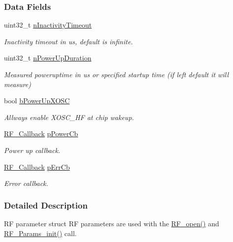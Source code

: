 \subsubsection*{Data Fields}
\begin{DoxyCompactItemize}
\item 
uint32\+\_\+t \hyperlink{struct_r_f___params_a01d3752799ea4318bbf9d1384cb49b97}{n\+Inactivity\+Timeout}
\begin{DoxyCompactList}\small\item\em Inactivity timeout in us, default is infinite. \end{DoxyCompactList}\item 
uint32\+\_\+t \hyperlink{struct_r_f___params_a58dc682aa09acabe6411ea186dd3aebf}{n\+Power\+Up\+Duration}
\begin{DoxyCompactList}\small\item\em Measured poweruptime in us or specified startup time (if left default it will measure) \end{DoxyCompactList}\item 
bool \hyperlink{struct_r_f___params_a66feaf5103de9d0b45085c7c44ea918b}{b\+Power\+Up\+X\+O\+S\+C}
\begin{DoxyCompactList}\small\item\em Allways enable X\+O\+S\+C\+\_\+\+H\+F at chip wakeup. \end{DoxyCompactList}\item 
\hyperlink{_r_f_8h_a4d2ce6dc70b0f329dc5e249ec10c574a}{R\+F\+\_\+\+Callback} \hyperlink{struct_r_f___params_ae683ebc129d40a11fb9ec7e371f1e11b}{p\+Power\+Cb}
\begin{DoxyCompactList}\small\item\em Power up callback. \end{DoxyCompactList}\item 
\hyperlink{_r_f_8h_a4d2ce6dc70b0f329dc5e249ec10c574a}{R\+F\+\_\+\+Callback} \hyperlink{struct_r_f___params_ab7be231b23fab2503b8c54b474fba74d}{p\+Err\+Cb}
\begin{DoxyCompactList}\small\item\em Error callback. \end{DoxyCompactList}\end{DoxyCompactItemize}


\subsubsection{Detailed Description}
R\+F parameter struct R\+F parameters are used with the \hyperlink{_r_f_8h_a13a7c6f5a2b797e0aac18fecfaba6f64}{R\+F\+\_\+open()} and \hyperlink{_r_f_8h_ab956de3745437cb7a69c4edfb006434e}{R\+F\+\_\+\+Params\+\_\+init()} call. 

